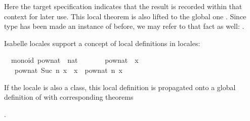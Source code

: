 \begin{isabellebody}
\begin{isamarkuptext}
\noindent Here the  target specification
  indicates that the result is recorded within that context for later
  use.  This local theorem is also lifted to the global one \hyperlink{fact.group.left-cancel:}{\mbox{}} .  Since type  has been made an instance of
   before, we may refer to that fact as well: .%
\end{isamarkuptext}%
\isamarkuptrue%
%
\isamarkuptrue%
%
\begin{isamarkuptext}%
Isabelle locales support a concept of local definitions
  in locales:%
\end{isamarkuptext}%
\isamarkuptrue%
%
\isadelimquote
%
\endisadelimquote
%
\isatagquote
{}\isamarkupfalse%
\ {\isacharparenleft}\ monoid{\isacharparenright}\ pow{\isacharunderscore}nat\ {\isacharcolon}{\isacharcolon}\ {\isachardoublequoteopen}nat\ {\isasymRightarrow}\ {\isasymalpha}\ {\isasymRightarrow}\ {\isasymalpha}{\isachardoublequoteclose}\ \isanewline
\ \ {\isachardoublequoteopen}pow{\isacharunderscore}nat\ {}\ x\ {\isacharequal}\ {\isasymone}{\isachardoublequoteclose}\isanewline
\ \ {\isacharbar}\ {\isachardoublequoteopen}pow{\isacharunderscore}nat\ {\isacharparenleft}Suc\ n{\isacharparenright}\ x\ {\isacharequal}\ x\ {\isasymotimes}\ pow{\isacharunderscore}nat\ n\ x{\isachardoublequoteclose}%
\endisatagquote
{\isafoldquote}%
%
\isadelimquote
%
\endisadelimquote
%
\begin{isamarkuptext}%
\noindent If the locale  is also a class, this local
  definition is propagated onto a global definition of
  with corresponding theorems

  .


\end{isamarkuptext}
\end{isabellebody}
